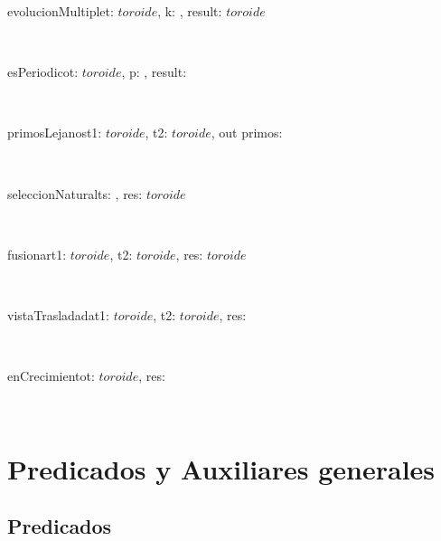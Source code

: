 \documentclass[a4paper]{article}
\begin{document}
	    \begin{proc}{evolucionMultiple}{\Inout t: $toroide$, \In k: \ent, \Out result: $toroide$}{}
    		\post{}
    	\end{proc} \\
    	
    	\begin{proc}{esPeriodico}{\In t: $toroide$, \Inout p: \ent, \Out result: \bool}{}
    		\post{}
    	\end{proc} \\
    	
    	\begin{proc}{primosLejanos}{\In t1: $toroide$, \In t2: $toroide$, out primos: \bool}{}
    		\post{}
    	\end{proc} \\
    	
    	\begin{proc}{seleccionNatural}{\In ts: , \Out res: $toroide$}{}
    		\post{}
    	\end{proc} \\
    	
    	\begin{proc}{fusionar}{\In t1: $toroide$, \In t2: $toroide$, \Out res: $toroide$}{}
    		\post{}
    	\end{proc} \\
	
	    \begin{proc}{vistaTrasladada}{\In t1: $toroide$, \In t2: $toroide$, \Out res: \bool}{}
    		\post{}
    	\end{proc} \\
    	
    	\begin{proc}{enCrecimiento}{\In t: $toroide$, \Out res: \bool}{}
    		\post{}
    	\end{proc} \\
	
	\section{Predicados y Auxiliares generales}
	
    	\subsection{Predicados}
	
\end{document}
